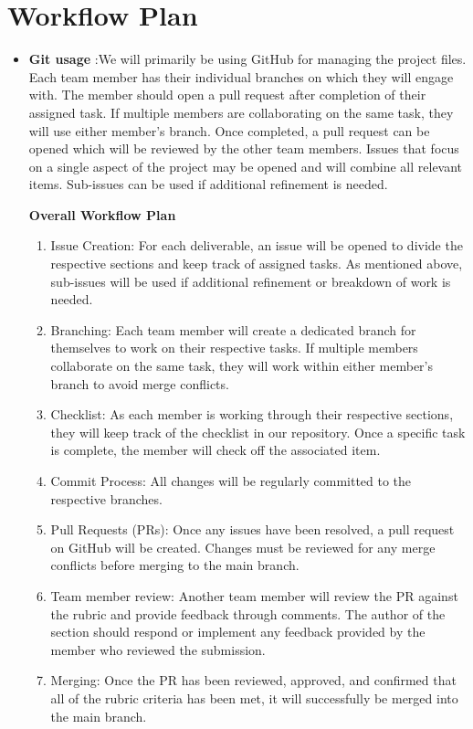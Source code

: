 \documentclass{article}
\begin{document}
\section{Workflow Plan}

\begin{itemize}
	\item \textbf{Git usage} :We will primarily be using GitHub for managing the project files.
Each team member has their individual branches on which they will engage with. 
The member should open a pull request after completion of their assigned task. If 
multiple members are collaborating on the same task, they will use either member's branch. Once completed, 
a pull request can be opened which will be reviewed by the other team members. 
Issues that focus on a single aspect of the project may be opened and will combine
all relevant items. Sub-issues can be used if additional refinement is needed. 

\textbf{Overall Workflow Plan}
\begin{enumerate}
 \item Issue Creation: For each deliverable, an issue will be opened to divide the respective sections and keep track of assigned tasks.
 As mentioned above, sub-issues will be used if additional refinement or breakdown of work is needed.
 \item Branching: Each team member will create a dedicated branch for themselves to work on their respective tasks. If multiple members
 collaborate on the same task, they will work within either member’s branch to avoid merge conflicts.
 \item Checklist: As each member is working through their respective sections, they will keep track of the checklist in our repository.
 Once a specific task is complete, the member will check off the associated item.
 \item Commit Process: All changes will be regularly committed to the respective branches.
 \item Pull Requests (PRs): Once any issues have been resolved, a pull request on GitHub will be created. Changes must be reviewed for
 any merge conflicts before merging to the main branch.
 \item Team member review: Another team member will review the PR against the rubric and provide feedback through comments. The author
 of the section should respond or implement any feedback provided by the member who reviewed the submission.
 \item Merging: Once the PR has been reviewed, approved, and confirmed that all of the rubric criteria has been met, it will successfully
 be merged into the main branch.
\end{enumerate}


\end{itemize}
\end{document}
